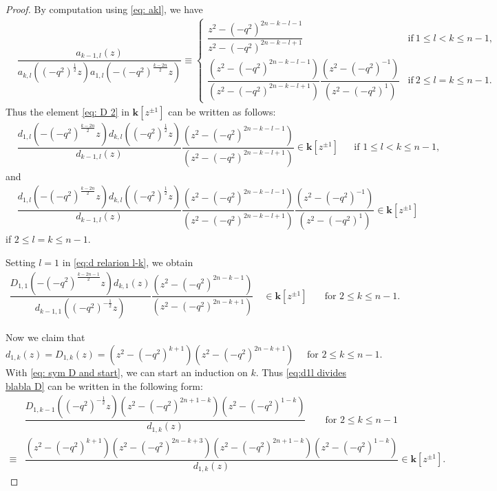 \documentclass[11pt, leqno]{amsart}
\theoremstyle{definition}
\numberwithin{equation}{section}
\begin{document}
\begin{proof}
By computation using \eqref{eq: akl}, we have
\begin{align*}
& \dfrac{a_{k-1,l}(z)}
 {a_{k,l}({(-q^2)}^{\frac{1}{2}}z) a_{1,l}(-{(-q^2)}^{\frac{k-2n}{2}}z)}  \equiv \begin{cases}
  \dfrac{z^2-{(-q^2)}^{2n-k-l-1}}{z^2-{(-q^2)}^{2n-k-l+1}}
  & \text{if}  \ 1 \le l < k \le n-1, \\[2ex]
  \dfrac{(z^2-{(-q^2)}^{2n-k-l-1})}{(z^2-{(-q^2)}^{2n-k-l+1})}
 \dfrac{( z^2-{(-q^2)}^{-1} )}{( z^2-{(-q^2)}^{1} )}
  & \text{if} \ 2 \le l = k \le n-1.
 \end{cases}
\end{align*}
Thus the element \eqref{eq: D 2} in ${\mathbf{k}}[z^{\pm 1}]$ can be written as follows:
\begin{align}\label{eq:d relarion l-k}
&\dfrac{d_{1,l}(-{(-q^2)}^{\frac{k-2n}{2}}z)d_{k,l}({(-q^2)}^{\frac{1}{2}}z)
}{d_{k-1,l}(z)}
  \dfrac{(z^2-{(-q^2)}^{2n-k-l-1})}{(z^2-{(-q^2)}^{2n-k-l+1})}
 \in {\mathbf{k}}[z^{\pm 1}] && \text{if $1 \le l  < k \le n-1$,}
  \end{align}
and
\begin{equation}\label{eq:d relarion 1-1}
\begin{aligned}
&\dfrac{d_{1,l}(-{(-q^2)}^{\frac{k-2n}{2}}z)d_{k,l}({(-q^2)}^{\frac{1}{2}}z)
}{d_{k-1,l}(z)} \dfrac{(z^2-{(-q^2)}^{2n-k-l-1})}{(z^2-{(-q^2)}^{2n-k-l+1})}
 \dfrac{( z^2-{(-q^2)}^{-1} )}{( z^2-{(-q^2)}^{1} )}
  \in {\mathbf{k}}[z^{\pm 1}]
  \end{aligned}
  \end{equation}
if $2 \le l = k \le n-1$.

Setting $l=1$ in \eqref{eq:d relarion l-k}, we obtain
\begin{align} \label{eq:dk1 l=1}
 \dfrac{ D_{1,1}(-{(-q^2)}^{\frac{k-2n-1}{2}}z)  d_{k,1}(z) }{d_{k-1,1}({(-q^2)}^{-\frac{1}{2}}z)}
 \dfrac{(z^2-{(-q^2)}^{2n-k-1})}{(z^2-{(-q^2)}^{2n-k+1})}
\quad \in {\mathbf{k}}[z^{\pm 1}] &\quad \text{for $2 \le k \le n-1$.}
\end{align}

Now we claim that
$$d_{1,k}(z)=D_{1,k}(z)=(z^2-{(-q^2)}^{k+1})(z^2-{(-q^2)}^{2n-k+1}) \quad \text{ for $2 \le k \le n-1$.}$$
With \eqref{eq: sym D and start}, we can start an induction on $k$. Thus \eqref{eq:d1l divides blabla D} can be written in
the following form:
\begin{equation}\label{eq:d1k}
\begin{aligned}
 &\dfrac{D_{1,k-1}({(-q^2)}^{-\frac{1}{2}}z)(z^2-{(-q^2)}^{2n+1-k})(z^2-{(-q^2)}^{1-k})}{d_{1,k}(z)} \qquad \text{for  $2 \le k \le n-1$}\\
 \equiv &\dfrac{(z^2-{(-q^2)}^{k+1})(z^2-{(-q^2)}^{2n-k+3})
 (z^2-{(-q^2)}^{2n+1-k})(z^2-{(-q^2)}^{1-k})}{d_{1,k}(z)}
     \in {\mathbf{k}}[z^{\pm 1}].
\end{aligned}
\end{equation}


\end{proof}
\end{document}
